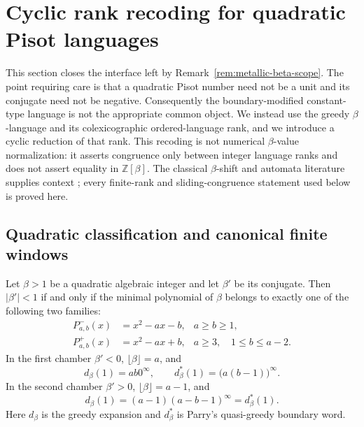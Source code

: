 \section{Cyclic rank recoding for quadratic Pisot languages}
\label{sec:quadratic-pisot-extension}

This section closes the interface left by Remark~\ref{rem:metallic-beta-scope}.
The point requiring care is that a quadratic Pisot number need not be a unit
and its conjugate need not be negative.  Consequently the boundary-modified
constant-type language is not the appropriate common object.  We instead use
the greedy $\beta$-language and its colexicographic ordered-language rank, and
we introduce a cyclic reduction of that rank.  This recoding is not numerical
$\beta$-value normalization: it asserts congruence only between integer
language ranks and does not assert equality in $\mathbb Z[\beta]$.  The
classical $\beta$-shift and automata literature supplies context
\cite{Renyi1957,ItoTakahashi1974,Parry1960,Blanchard1989,Loraud1995,
BruyereHansel1997,LecomteRigo2001}; every finite-rank and
sliding-congruence statement used below is proved here.

\subsection{Quadratic classification and canonical finite windows}

\begin{lemma}
\label{lem:quadratic-pisot-chambers}
Let $\beta>1$ be a quadratic algebraic integer and let $\beta'$ be its
conjugate.  Then $|\beta'|<1$ if and only if the minimal polynomial of
$\beta$ belongs to exactly one of the following two families:
\begin{align*}
P^-_{a,b}(x)&=x^2-ax-b, & a\ge b\ge1,\\
P^+_{a,b}(x)&=x^2-ax+b, & a\ge3,\quad 1\le b\le a-2.
\end{align*}
In the first chamber $\beta'<0$, $\lfloor\beta\rfloor=a$, and
\[
d_\beta(1)=ab0^\infty,\qquad
d_\beta^*(1)=\bigl(a(b-1)\bigr)^\infty.
\]
In the second chamber $\beta'>0$, $\lfloor\beta\rfloor=a-1$, and
\[
d_\beta(1)=(a-1)(a-b-1)^\infty=d_\beta^*(1).
\]
Here $d_\beta$ is the greedy expansion and $d_\beta^*$ is Parry's
quasi-greedy boundary word.
\end{lemma}

